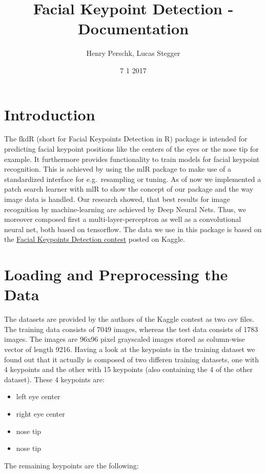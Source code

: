 \documentclass[]{article}
\title{Facial Keypoint Detection - Documentation}
\author{Henry Perschk, Lucas Stegger}
\date{7 1 2017}
\providecommand{\tightlist}{%
  \setlength{\itemsep}{0pt}\setlength{\parskip}{0pt}}
\begin{document}
{
\setcounter{tocdepth}{2}
\tableofcontents
}

\newpage
\section{Introduction}\label{introduction}

The fkdR (short for Facial Keypoints Detection in R) package is intended
for predicting facial keypoint positions like the centers of the eyes or
the nose tip for example. It furthermore provides functionality to train
models for facial keypoint recognition. This is achieved by using the
mlR package to make use of a standardized interface for e.g.~resampling
or tuning. As of now we implemented a patch search learner with mlR to
show the concept of our package and the way image data is handled. Our
research showed, that best results for image recognition by
machine-learning are achieved by Deep Neural Nets. Thus, we moreover
composed first a multi-layer-perceptron as well as a convolutional
neural net, both based on tensorflow. The data we use in this package is
based on the
\href{https://www.kaggle.com/c/facial-keypoints-detection}{Facial
Keypoints Detection contest} posted on Kaggle.


\section{Loading and Preprocessing the
Data}\label{loading-and-preprocessing-the-data}

The datasets are provided by the authors of the Kaggle contest as two
csv files. The training data consists of 7049 images, whereas the test
data consists of 1783 images. The images are 96x96 pixel grayscaled
images stored as column-wise vector of length 9216. Having a look at the
keypoints in the training dataset we found out that it actually is
composed of two differen training datasets, one with 4 keypoints and the
other with 15 keypoints (also containing the 4 of the other dataset).
These 4 keypoints are:

\begin{itemize}
\tightlist
\item
  left eye center
\item
  right eye center
\item
  nose tip
\item
  nose tip
\end{itemize}

The remaining keypoints are the following:
\end{document}
